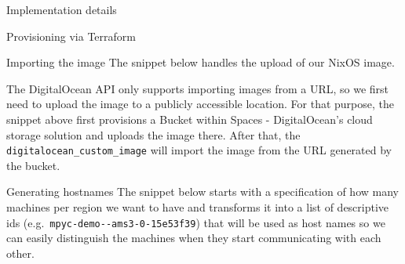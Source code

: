 \begin{frame}[fragile]{Implementation details}
\begin{block}{Provisioning via Terraform}
\begin{block}{Importing the image}
\protect\hypertarget{importing-the-image}{}
The snippet below handles the upload of our NixOS image.

\newpage

\begin{Shaded}
\begin{Highlighting}[]
\NormalTok{\}}


\NormalTok{  \}}
\NormalTok{\}}

\NormalTok{\}}


\NormalTok{    replace\_triggered\_by = [}
\NormalTok{    ]}
\NormalTok{  \}}
\NormalTok{\}}
\end{Highlighting}
\end{Shaded}

The DigitalOcean API only supports importing images from a URL, so we
first need to upload the image to a publicly accessible location. For
that purpose, the snippet above first provisions a Bucket within Spaces
- DigitalOcean's cloud storage solution and uploads the image there.
After that, the \texttt{digitalocean\_custom\_image} will import the
image from the URL generated by the bucket.
\end{block}

\begin{block}{Generating hostnames}
\protect\hypertarget{generating-hostnames}{}
The snippet below starts with a specification of how many machines per
region we want to have and transforms it into a list of descriptive ids
(e.g.~\texttt{mpyc-demo-\/-ams3-0-15e53f39}) that will be used as host
names so we can easily distinguish the machines when they start
communicating with each other.


\end{block}
\end{block}
\end{frame}
